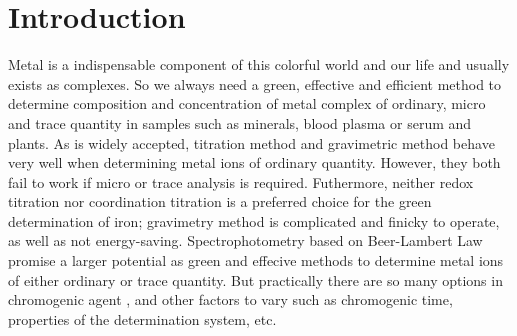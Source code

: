 \ifx\SUM\undefined


\fi

\section{Introduction}

Metal is a indispensable component of this colorful world and our life and usually exists as complexes. So we always need a green, effective and efficient method to determine composition and concentration of metal complex of ordinary, micro and trace quantity in samples such as minerals, blood plasma or serum\cite{Ramsay1957The,Wong1923COLORIMETRIC} and plants\cite{Reis1994Multicommutation, Suo-YiHuang2004DeterminationofIron}. %
As is widely accepted, titration method\cite{Pesavento1999Determination,Yi1996Complexometric} and gravimetric method\cite{Shome1950Gravimetric} behave very well when determining metal ions of ordinary quantity. However, they both fail to work if micro or trace analysis is required. Futhermore, neither redox titration nor coordination titration is a preferred choice for the green determination of iron; gravimetry method is complicated and finicky to operate, as well as not energy-saving.
Spectrophotometry based on Beer-Lambert Law\cite{LambertLambert} promise a larger potential as green and effecive methods to determine metal ions of either ordinary or trace quantity\cite{King1991Spectrophotometric,Carter1971Spectrophotometric,T1975Nitrosophenol}. But practically there are so many options in chromogenic agent \cite{Yoe1944Colorimetric,Stookey1970Ferrozine,Er-KunShang20134}, and other factors to vary such as chromogenic time, properties of the determination system, etc.


